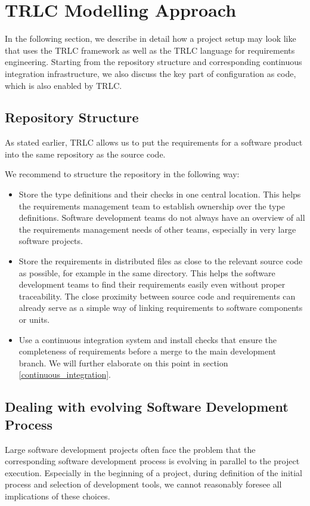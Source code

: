 \documentclass[english]{lni}
\begin{document}
\section{TRLC Modelling Approach}
\label{modeling_approach}

In the following section, we describe in detail how a project setup
may look like that uses the TRLC framework as well as the TRLC
language for requirements engineering. Starting from the repository
structure and corresponding continuous integration infrastructure, we
also discuss the key part of configuration as code, which is also
enabled by TRLC.

\subsection{Repository Structure}
As stated earlier, TRLC allows us to put the requirements for a
software product into the same repository as the source code.

We recommend to structure the repository in the following way:
\begin{itemize}
\item Store the type definitions and their checks in one central
  location.  This helps the requirements management team to establish
  ownership over the type definitions.  Software development teams do
  not always have an overview of all the requirements management needs
  of other teams, especially in very large software projects.
\item Store the requirements in distributed files as close to the
  relevant source code as possible, for example in the same directory.
  This helps the software development teams to find their requirements
  easily even without proper traceability.  The close proximity
  between source code and requirements can already serve as a simple
  way of linking requirements to software components or units.
\item Use a continuous integration system and install checks that
  ensure the completeness of requirements before a merge to the main
  development branch.  We will further elaborate on this point in
  section \ref{continuous_integration}.
\end{itemize}

\subsection{Dealing with evolving Software Development Process}
Large software development projects often face the problem that the
corresponding software development process is evolving in parallel to
the project execution. Especially in the beginning of a project,
during definition of the initial process and selection of development
tools, we cannot reasonably foresee all implications of these choices.
\end{document}
